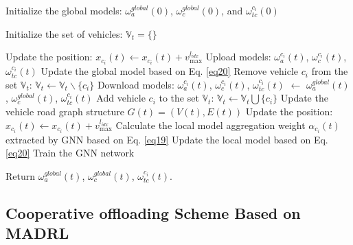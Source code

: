 \documentclass[lettersize,journal,onecolumn]{IEEEtran}
\begin{document}
\begin{algorithm}[b!]
 	\caption{Distributed FL Algorithm Based on GNN}
 	\label{algorithm1}
	Initialize the global models: $\omega _{a}^{global}(0)$, $\omega _{c}^{global}(0)$, and $\omega _{tc}^{{{{c}}_{i}}}(0)$\;
	
 	Initialize the set of vehicles: \({{\mathbb{V}}_{t}}=\{\}\)\;
 	
 	{
 		
 		{
 			Update the position: ${{x}_{{{c}_{i}}}}(t)\leftarrow {{x}_{{{c}_{i}}}}(t)+v_{\max }^{{{l}_{idx}}}$\;
 			{
 				Upload models: $\omega _{a}^{{{{c}}_{i}}}(t)$, $\omega _{c}^{{{{c}}_{i}}}(t)$, $\omega _{tc}^{{{{c}}_{i}}}(t)$\;
 				Update the global model based on Eq. \eqref{eq20}\;
 				Remove vehicle \({{c}_{i}}\) from the set ${{\mathbb{V}}_{t}}$: ${{\mathbb{V}}_{t}}\leftarrow {{\mathbb{V}}_{t}}\backslash \{{{c}_{i}}\}$\;
 			}
 		}
 		{
 				Download models: $\omega _{a}^{{{{c}}_{i}}}(t)$, $\omega _{c}^{{{{c}}_{i}}}(t)$, $\omega _{tc}^{{{{c}}_{i}}}(t)$ \(\leftarrow\) $\omega _{a}^{global}(t)$, $\omega _{c}^{global}(t)$, $\omega _{tc}^{{{{c}}_{i}}}(t)$\;
 				Add vehicle \({{c}_{i}}\) to the set ${{\mathbb{V}}_{t}}$: ${{\mathbb{V}}_{t}}\leftarrow {{\mathbb{V}}_{t}}\bigcup \{{{c}_{i}}\}$\;
 		}
 		Update the vehicle road graph structure $G(t)=(V(t),E(t))$\;
 		{
 			Update the position: ${{x}_{{{c}_{i}}}}(t)\leftarrow {{x}_{{{c}_{i}}}}(t)+v_{\max }^{{{l}_{idx}}}$\;
 			{
 				Calculate the local model aggregation weight ${{\alpha }_{{{c}_{i}}}}\left( t \right)$ extracted by GNN based on Eq. \eqref{eq19}\;
 				Update the local model based on Eq. \eqref{eq20}\;
 			}
 		}
 		Train the GNN network\;		
 	}
 Return $\omega _{a}^{global}(t)$, $\omega _{c}^{global}(t)$, $\omega _{tc}^{{{{c}}_{i}}}(t)$.
\end{algorithm}
\subsection{Cooperative offloading Scheme Based on MADRL}
\end{document}
